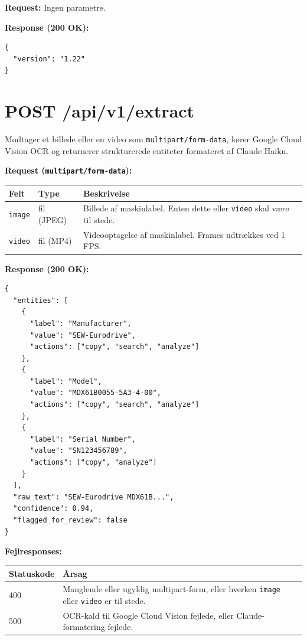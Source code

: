 \documentclass[12pt, a4paper, oneside]{report}
\begin{document}
\textbf{Request:} Ingen parametre.

\textbf{Response (200 OK):}
\begin{lstlisting}[language={}]
{
  "version": "1.22"
}
\end{lstlisting}

\section*{POST /api/v1/extract}

Modtager et billede eller en video som \texttt{multipart/form-data},
kører Google Cloud Vision OCR og returnerer strukturerede entiteter
formateret af Claude Haiku.

\textbf{Request (\texttt{multipart/form-data}):}

\begin{table}[H]
\centering
\begin{tabularx}{\textwidth}{llX}
\toprule
\textbf{Felt} & \textbf{Type} & \textbf{Beskrivelse} \\
\midrule
\texttt{image} & fil (JPEG) & Billede af maskinlabel. Enten dette eller \texttt{video} skal være til stede. \\
\texttt{video} & fil (MP4)  & Videooptagelse af maskinlabel. Frames udtrækkes ved 1 FPS. \\
\bottomrule
\end{tabularx}
\end{table}

\textbf{Response (200 OK):}
\begin{lstlisting}[language={}]
{
  "entities": [
    {
      "label": "Manufacturer",
      "value": "SEW-Eurodrive",
      "actions": ["copy", "search", "analyze"]
    },
    {
      "label": "Model",
      "value": "MDX61B0055-5A3-4-00",
      "actions": ["copy", "search", "analyze"]
    },
    {
      "label": "Serial Number",
      "value": "SN123456789",
      "actions": ["copy", "analyze"]
    }
  ],
  "raw_text": "SEW-Eurodrive MDX61B...",
  "confidence": 0.94,
  "flagged_for_review": false
}
\end{lstlisting}

\textbf{Fejlresponses:}

\begin{table}[H]
\centering
\begin{tabularx}{\textwidth}{lX}
\toprule
\textbf{Statuskode} & \textbf{Årsag} \\
\midrule
400 & Manglende eller ugyldig multipart-form, eller hverken \texttt{image} eller \texttt{video} er til stede. \\
500 & OCR-kald til Google Cloud Vision fejlede, eller Claude-formatering fejlede. \\
\bottomrule
\end{tabularx}
\end{table}
\end{document}
